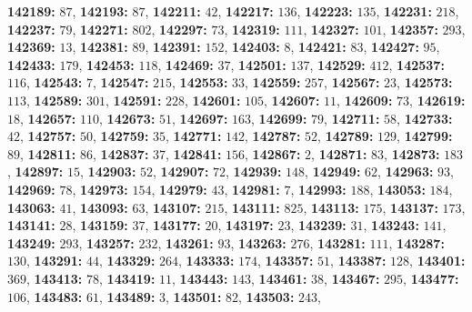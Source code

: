 \textsf{\bfseries 142189:} $87$, \textsf{\bfseries 142193:} $87$, \textsf{\bfseries 142211:} $42$, \textsf{\bfseries 142217:} $136$, \textsf{\bfseries 142223:} $135$, \textsf{\bfseries 142231:} $218$, \textsf{\bfseries 142237:} $79$, \textsf{\bfseries 142271:} $802$, \textsf{\bfseries 142297:} $73$, \textsf{\bfseries 142319:} $111$, \textsf{\bfseries 142327:} $101$, \textsf{\bfseries 142357:} $293$, \textsf{\bfseries 142369:} $13$, \textsf{\bfseries 142381:} $89$, \textsf{\bfseries 142391:} $152$, \textsf{\bfseries 142403:} $8$, \textsf{\bfseries 142421:} $83$, \textsf{\bfseries 142427:} $95$, \textsf{\bfseries 142433:} $179$, \textsf{\bfseries 142453:} $118$, \textsf{\bfseries 142469:} $37$, \textsf{\bfseries 142501:} $137$, \textsf{\bfseries 142529:} $412$, \textsf{\bfseries 142537:} $116$, \textsf{\bfseries 142543:} $7$, \textsf{\bfseries 142547:} $215$, \textsf{\bfseries 142553:} $33$, \textsf{\bfseries 142559:} $257$, \textsf{\bfseries 142567:} $23$, \textsf{\bfseries 142573:} $113$, \textsf{\bfseries 142589:} $301$, \textsf{\bfseries 142591:} $228$, \textsf{\bfseries 142601:} $105$, \textsf{\bfseries 142607:} $11$, \textsf{\bfseries 142609:} $73$, \textsf{\bfseries 142619:} $18$, \textsf{\bfseries 142657:} $110$, \textsf{\bfseries 142673:} $51$, \textsf{\bfseries 142697:} $163$, \textsf{\bfseries 142699:} $79$, \textsf{\bfseries 142711:} $58$, \textsf{\bfseries 142733:} $42$, \textsf{\bfseries 142757:} $50$, \textsf{\bfseries 142759:} $35$, \textsf{\bfseries 142771:} $142$, \textsf{\bfseries 142787:} $52$, \textsf{\bfseries 142789:} $129$, \textsf{\bfseries 142799:} $89$, \textsf{\bfseries 142811:} $86$, \textsf{\bfseries 142837:} $37$, \textsf{\bfseries 142841:} $156$, \textsf{\bfseries 142867:} $2$, \textsf{\bfseries 142871:} $83$, \textsf{\bfseries 142873:} $183$, \textsf{\bfseries 142897:} $15$, \textsf{\bfseries 142903:} $52$, \textsf{\bfseries 142907:} $72$, \textsf{\bfseries 142939:} $148$, \textsf{\bfseries 142949:} $62$, \textsf{\bfseries 142963:} $93$, \textsf{\bfseries 142969:} $78$, \textsf{\bfseries 142973:} $154$, \textsf{\bfseries 142979:} $43$, \textsf{\bfseries 142981:} $7$, \textsf{\bfseries 142993:} $188$, \textsf{\bfseries 143053:} $184$, \textsf{\bfseries 143063:} $41$, \textsf{\bfseries 143093:} $63$, \textsf{\bfseries 143107:} $215$, \textsf{\bfseries 143111:} $825$, \textsf{\bfseries 143113:} $175$, \textsf{\bfseries 143137:} $173$, \textsf{\bfseries 143141:} $28$, \textsf{\bfseries 143159:} $37$, \textsf{\bfseries 143177:} $20$, \textsf{\bfseries 143197:} $23$, \textsf{\bfseries 143239:} $31$, \textsf{\bfseries 143243:} $141$, \textsf{\bfseries 143249:} $293$, \textsf{\bfseries 143257:} $232$, \textsf{\bfseries 143261:} $93$, \textsf{\bfseries 143263:} $276$, \textsf{\bfseries 143281:} $111$, \textsf{\bfseries 143287:} $130$, \textsf{\bfseries 143291:} $44$, \textsf{\bfseries 143329:} $264$, \textsf{\bfseries 143333:} $174$, \textsf{\bfseries 143357:} $51$, \textsf{\bfseries 143387:} $128$, \textsf{\bfseries 143401:} $369$, \textsf{\bfseries 143413:} $78$, \textsf{\bfseries 143419:} $11$, \textsf{\bfseries 143443:} $143$, \textsf{\bfseries 143461:} $38$, \textsf{\bfseries 143467:} $295$, \textsf{\bfseries 143477:} $106$, \textsf{\bfseries 143483:} $61$, \textsf{\bfseries 143489:} $3$, \textsf{\bfseries 143501:} $82$, \textsf{\bfseries 143503:} $243$, 
